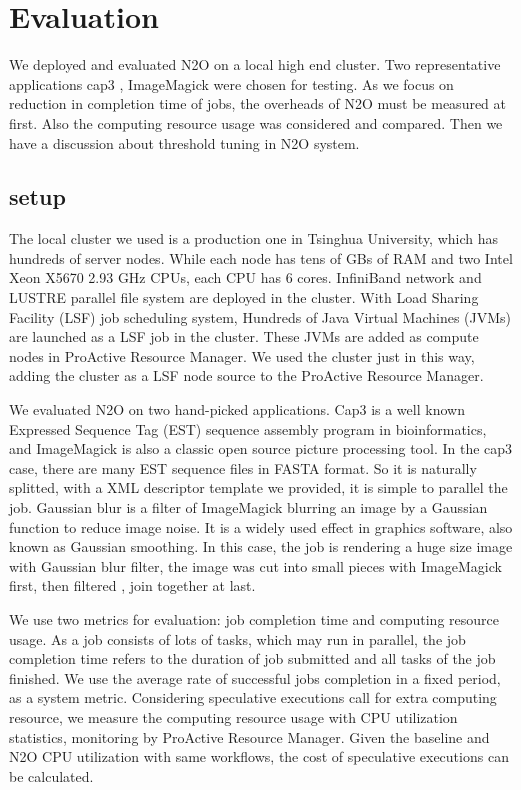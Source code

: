 \section{Evaluation}
We deployed and evaluated N2O on a local high end cluster. Two representative applications cap3 , ImageMagick were chosen for testing. As we focus on reduction in completion time of jobs, the overheads of N2O must be measured at first. Also the computing resource usage was considered and compared. Then we have a discussion about threshold tuning in N2O system.

\subsection{setup}

The local cluster we used is a production one in Tsinghua University, which has hundreds of  server nodes. While each node has tens of GBs of RAM and two Intel Xeon X5670 2.93 GHz CPUs, each CPU has 6 cores. InfiniBand network and LUSTRE parallel file system are deployed in the cluster. With Load Sharing Facility (LSF) job scheduling system, Hundreds of Java Virtual Machines (JVMs) are launched as a LSF job in the cluster. These JVMs are added as compute nodes in ProActive Resource Manager. We used the cluster just in this way, adding the cluster as a LSF node source to the ProActive Resource Manager.

We evaluated N2O on two hand-picked applications. Cap3 is a well known Expressed Sequence Tag (EST) sequence assembly program in bioinformatics, and ImageMagick is also a classic open source picture processing tool. In the cap3 case, there are many EST sequence files in FASTA format. So it is naturally splitted, with a XML descriptor template we provided, it is simple to parallel the job. Gaussian blur is a filter of ImageMagick blurring an image by a Gaussian function to reduce image noise. It is a widely used effect in graphics software, also known as Gaussian smoothing. In this case, the job is rendering a huge size image with Gaussian blur filter, the image was cut into small pieces with ImageMagick first, then filtered , join together at last. 

We use two metrics for evaluation: job completion time and computing resource usage. As a job consists of lots of tasks, which may run in parallel, the job completion time refers to the duration of job submitted and all tasks of the job finished. We use the average rate of successful jobs completion in a fixed period, as a system metric. Considering speculative executions call for extra computing resource, we measure the computing resource usage with CPU utilization statistics, monitoring by ProActive Resource Manager. Given the baseline and N2O CPU utilization with same workflows, the cost of speculative executions can be calculated.

